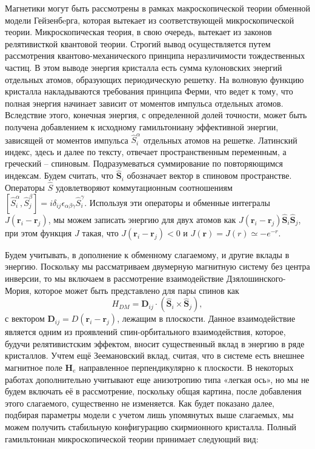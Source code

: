 \documentclass[a4paper,article,14pt]{extarticle}
\begin{document}
Магнетики могут быть рассмотрены в рамках макроскопической теории обменной модели Гейзенбeрга, которая вытекает из соответствующей микроскопической теории. Микроскопическая теория, в свою очередь, вытекает из законов релятивисткой квантовой теории.  Строгий вывод осуществляется путем рассмотрения квантово-механического принципа неразличимости тождественных частиц. В этом выводе энергия кристалла есть сумма кулоновских энергий отдельных атомов, образующих периодическую решетку. На волновую функцию кристалла накладываются требования принципа Ферми, что ведет к тому, что полная энергия начинает зависит от моментов импульса отдельных атомов. Вследствие этого, конечная энергия, с определенной долей точности, может быть получена добавлением к исходному гамильтониану эффективной энергии, зависящей от моментов импульса $\widehat{S}_i^\alpha$ отдельных атомов на решетке. Латинский индекс, здесь и далее по тексту, отвечает пространственным переменным, а греческий – спиновым. Подразумеваться суммирование по повторяющимся индексам. Будем считать, что $\widehat {\mathbf{S}}_{i}$ обозначает вектор в спиновом пространстве. Операторы $\widehat{S}$ удовлетворяют коммутационным соотношениям $[\widehat{S}_i^\alpha, \widehat{S}_j^\beta]=i \delta_{ij} \epsilon_{\alpha \beta \gamma} \widehat{S}_i^\gamma $. Используя эти операторы и обменные интегралы $J(\mathbf{r}_i - \mathbf{r}_j)$, мы можем записать энергию для двух атомов как $J\left(\mathbf{r}_i - \mathbf{r}_j \right){{\widehat {\mathbf{S}}}_i}{{\widehat {\mathbf{S}}}_j}$, при этом  функция $ J$ такая, что $J\left(\mathbf{r}_i - \mathbf{r}_j \right)<0$ и $J(\mathbf{r})=J(r)\simeq -e^{-r}$.

Будем учитывать, в дополнение к обменному слагаемому, и другие вклады в энергию. Поскольку мы рассматриваем двумерную магнитную систему без центра инверсии, то мы включаем в рассмотрение взаимодействие Дзялошинского-Мория, которое может быть представлено для пары спинов как 
$${H_{DM}} = {{\mathbf{D}}_{ij}} \cdot \left( {\widehat {\mathbf{S}}}_{i} \times {{\widehat {\mathbf{S}}}_j} \right), $$
с вектором $\mathbf{D}_{ij} = D \left(\mathbf{r}_i - \mathbf{r}_j \right)$, лежащим в плоскости. \cite{lacrox} Данное взаимодействие является одним из проявлений спин-орбитального взаимодействия, которое, будучи релятивистским эффектом, вносит существенный вклад в энергию в ряде кристаллов.\cite{Luo2019} Учтем ещё Зеемановский вклад, считая, что в системе есть внешнее магнитное поле $\mathbf{H}_e$ направленное перпендикулярно к плоскости. В некоторых работах дополнительно учитывают еще анизотропию типа «легкая ось», \cite{bogdanov} но мы не будем включать её в рассмотрение, поскольку общая картина, после добавления этого слагаемого, существенно не изменяется. Как будет показано далее, подбирая параметры модели с учетом лишь упомянутых выше слагаемых, мы можем получить стабильную конфигурацию скирмионного кристалла. Полный гамильтониан микроскопической теории принимает следующий вид:
\end{document}
